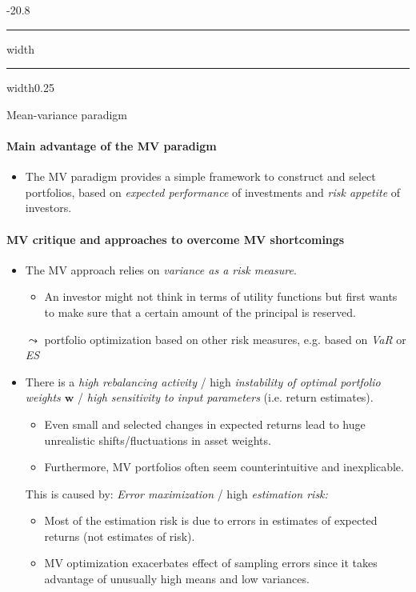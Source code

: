\documentclass[a4paper,landscape,8pt,fleqn]{scrartcl}
\makeatletter
\renewcommand{\section}{\@startsection{section}{1}{0mm}%
{-2\baselineskip}{0.8\baselineskip}%
{\hrule depth 0.2pt width\columnwidth\hrule depth1.5pt
width0.25\columnwidth\vspace*{1.2em}\Large\bfseries}}
\makeatother
\begin{document}
\begin{multicols*}{3}
\section{Mean-variance paradigm}

\paragraph{Main advantage of the MV paradigm}
\begin{itemize}
\item The MV paradigm provides a simple framework to construct and select portfolios, based on \textit{expected performance} of investments and \textit{risk appetite} of investors.
\end{itemize}

\paragraph{MV critique and approaches to overcome MV shortcomings}
\begin{itemize}
\item The MV approach relies on \textit{variance as a risk measure}.
\begin{itemize}
\item An investor might not think in terms of utility functions but first wants to make sure that a certain amount of the principal is reserved.
\end{itemize}
$\leadsto$ portfolio optimization based on other risk measures, e.g. based on \textit{VaR} or \textit{ES}
\item There is a \textit{high rebalancing activity} / high \textit{instability of optimal portfolio weights $\bm w$} / \textit{high sensitivity to input parameters} (i.e. return estimates).
\begin{itemize}
\item Even small and selected changes in expected returns lead to huge unrealistic shifts/fluctuations in asset weights.
\item Furthermore, MV portfolios often seem counterintuitive and inexplicable.
\end{itemize}
This is caused by: \textit{Error maximization} / high \textit{estimation risk:}
\begin{itemize}
\item Most of the estimation risk is due to errors in estimates of expected returns (not estimates of risk).
\item MV optimization exacerbates effect of sampling errors since it takes advantage of unusually high means and low variances.

\end{itemize}
\end{itemize}
\end{multicols*}
\end{document}
